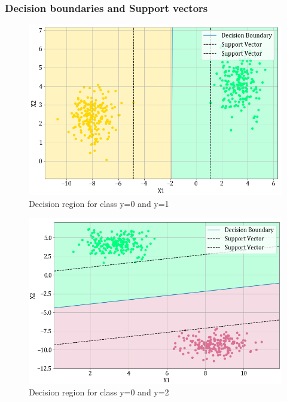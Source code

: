 \documentclass[11pt,a4paper]{article}
\begin{document}
\subsubsection{Decision boundaries and Support vectors}

\begin{figure}[H]
    \centering
    \includegraphics[scale=0.55]{images/1A_ovo_01.png}
    \caption{Decision region for class y=0 and y=1}
\end{figure}

\begin{figure}[H]
    \centering
    \includegraphics[scale=0.55]{images/1A_ovo_02.png}
    \caption{Decision region for class y=0 and y=2}
\end{figure}
\end{document}

